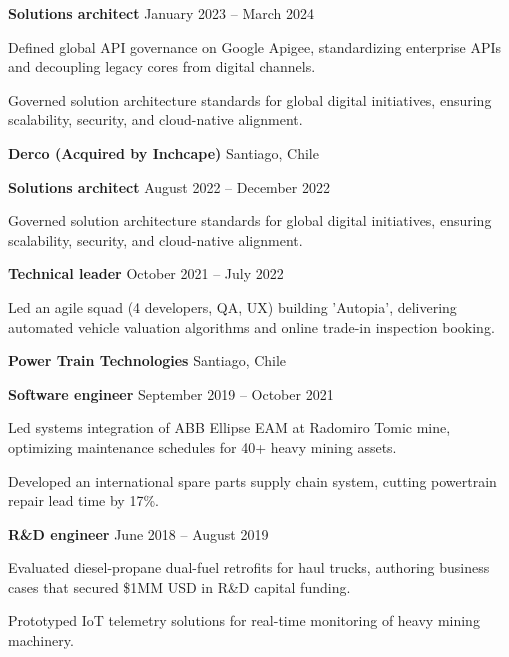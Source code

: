 \documentclass[11pt]{article}
\let\olditemize\itemize
\let\endolditemize\enditemize
\renewenvironment{itemize}[1][]{%
  \olditemize
  \setlength{\itemsep}{0pt}%
  \setlength{\parskip}{0pt}%
  \setlength{\parsep}{0pt}%
  \setlength{\partopsep}{0pt}%
}{%
  \endolditemize
}
\begin{document}
\textbf{Solutions architect} \hfill January 2023 -- March 2024
\begin{itemize}[noitemsep, topsep=0pt, partopsep=0pt, parsep=0pt]
    \item Defined global API governance on Google Apigee, standardizing enterprise APIs and decoupling legacy cores from digital channels.
    \item Governed solution architecture standards for global digital initiatives, ensuring scalability, security, and cloud-native alignment.
\end{itemize}

\textbf{Derco (Acquired by Inchcape)} \hfill Santiago, Chile

\textbf{Solutions architect} \hfill August 2022 -- December 2022
\begin{itemize}[noitemsep, topsep=0pt, partopsep=0pt, parsep=0pt]
    \item Governed solution architecture standards for global digital initiatives, ensuring scalability, security, and cloud-native alignment.
\end{itemize}

\textbf{Technical leader} \hfill October 2021 -- July 2022
\begin{itemize}[noitemsep, topsep=0pt, partopsep=0pt, parsep=0pt]
    \item Led an agile squad (4 developers, QA, UX) building 'Autopia', delivering automated vehicle valuation algorithms and online trade-in inspection booking.
\end{itemize}

\textbf{Power Train Technologies} \hfill Santiago, Chile

\textbf{Software engineer} \hfill September 2019 -- October 2021
\begin{itemize}[noitemsep, topsep=0pt, partopsep=0pt, parsep=0pt]
    \item Led systems integration of ABB Ellipse EAM at Radomiro Tomic mine, optimizing maintenance schedules for 40+ heavy mining assets.
    \item Developed an international spare parts supply chain system, cutting powertrain repair lead time by 17\%.
\end{itemize}

\textbf{R\&D engineer} \hfill June 2018 -- August 2019
\begin{itemize}[noitemsep, topsep=0pt, partopsep=0pt, parsep=0pt]
    \item Evaluated diesel-propane dual-fuel retrofits for haul trucks, authoring business cases that secured \$1MM USD in R\&D capital funding.
    \item Prototyped IoT telemetry solutions for real-time monitoring of heavy mining machinery.
\end{itemize}
\end{document}
